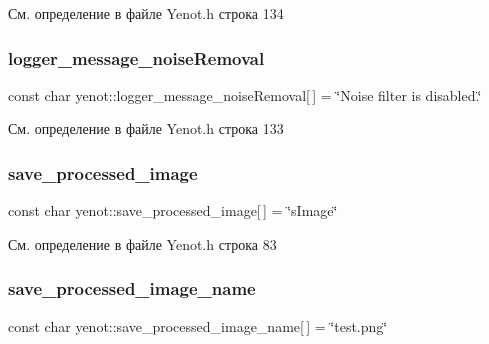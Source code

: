См. определение в файле Yenot.\+h строка 134

\mbox{\label{namespaceyenot_a27e7d588bfc41ad2d47d044d4541dad5}} 
\subsubsection{\texorpdfstring{logger\+\_\+message\+\_\+noise\+Removal}{logger\_message\_noiseRemoval}}
{\footnotesize\ttfamily const char yenot\+::logger\+\_\+message\+\_\+noise\+Removal\mbox{[}$\,$\mbox{]} = \char`\"{}Noise filter is disabled.\char`\"{}}



См. определение в файле Yenot.\+h строка 133

\mbox{\label{namespaceyenot_ab35e22cfa0a4ef6c8e960cfa75873aa0}} 
\subsubsection{\texorpdfstring{save\+\_\+processed\+\_\+image}{save\_processed\_image}}
{\footnotesize\ttfamily const char yenot\+::save\+\_\+processed\+\_\+image\mbox{[}$\,$\mbox{]} = \char`\"{}s\+Image\char`\"{}}



См. определение в файле Yenot.\+h строка 83

\mbox{\label{namespaceyenot_afe93bb98a5b2fd1f0cab330e4da59332}} 
\subsubsection{\texorpdfstring{save\+\_\+processed\+\_\+image\+\_\+name}{save\_processed\_image\_name}}
{\footnotesize\ttfamily const char yenot\+::save\+\_\+processed\+\_\+image\+\_\+name\mbox{[}$\,$\mbox{]} = \char`\"{}test.\+png\char`\"{}}



